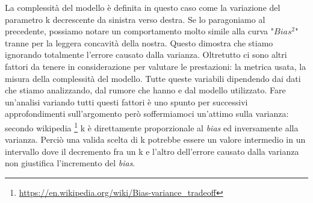 La complessit\`a del modello \`e definita in questo caso come la variazione del parametro k decrescente da sinistra verso destra.
Se lo paragoniamo al precedente, possiamo notare un comportamento molto simile alla curva "\textit{$Bias^2$}" tranne per la leggera concavit\`a della nostra. Questo dimostra che stiamo ignorando totalmente l'errore causato dalla varianza. Oltretutto ci sono altri fattori da tenere in considerazione per valutare le prestazioni: la metrica usata, la misura della complessit\`a del modello. Tutte queste variabili dipendendo dai dati che stiamo analizzando, dal rumore che hanno e dal modello utilizzato. Fare un'analisi variando tutti questi fattori \`e uno spunto per successivi approfondimenti sull'argomento per\`o soffermiamoci un'attimo sulla varianza: secondo wikipedia \footnote{\url{https://en.wikipedia.org/wiki/Bias-variance_tradeoff}} k \`e direttamente proporzionale al \textit{bias} ed inversamente alla varianza. Perci\`o una valida scelta di k potrebbe essere un valore intermedio in un intervallo dove il decremento fra un k e l'altro dell'errore causato dalla varianza non giustifica l'incremento del \textit{bias}.
